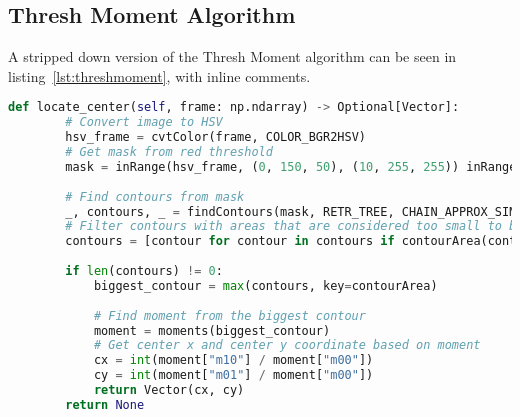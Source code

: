 \subsection{Thresh Moment Algorithm}\label{solution:thresh_moment}

A stripped down version of the Thresh Moment algorithm can be seen in listing~\ref{lst:threshmoment}, with inline comments.

\begin{lstlisting}[language=Python,label={lst:threshmoment},caption={Stripped down version of thresh moment from thresh\_moment.py}]
	def locate_center(self, frame: np.ndarray) -> Optional[Vector]:
	    # Convert image to HSV
	    hsv_frame = cvtColor(frame, COLOR_BGR2HSV)
	    # Get mask from red threshold
	    mask = inRange(hsv_frame, (0, 150, 50), (10, 255, 255)) inRange(hsv_frame, (170, 150, 50), (180, 255, 255))
	    
	    # Find contours from mask
	    _, contours, _ = findContours(mask, RETR_TREE, CHAIN_APPROX_SIMPLE)
	    # Filter contours with areas that are considered too small to be the target
	    contours = [contour for contour in contours if contourArea(contour) > 20]
	    
	    if len(contours) != 0:
		    biggest_contour = max(contours, key=contourArea)
		    
		    # Find moment from the biggest contour
		    moment = moments(biggest_contour)
		    # Get center x and center y coordinate based on moment
		    cx = int(moment["m10"] / moment["m00"])
		    cy = int(moment["m01"] / moment["m00"])
		    return Vector(cx, cy)
	    return None
\end{lstlisting}